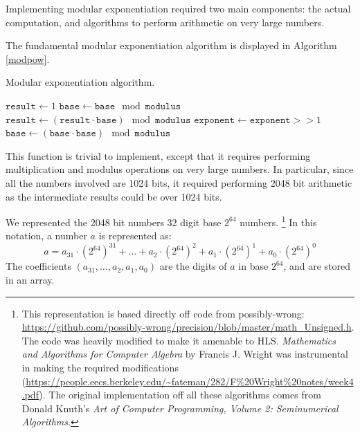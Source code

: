 Implementing modular exponentiation required two main components: the actual computation, and algorithms to perform
arithmetic on very large numbers.

The fundamental modular exponentiation algorithm is displayed in Algorithm \ref{modpow}.

\begin{algorithm}[!htb]
  \label{modpow}
  \caption[test]{Modular exponentiation algorithm.\footnotemark}
  \begin{algorithmic}
    \EndIf
    \State $\mathtt{result} \gets 1$
    \State $\mathtt{base} \gets \mathtt{base} \mod \mathtt{modulus}$
        \State $\mathtt{result} \gets (\mathtt{result} \cdot \mathtt{base}) \mod \mathtt{modulus}$
      \EndIf
      \State $\mathtt{exponent} \gets \mathtt{exponent} >> 1$
      \State $\mathtt{base} \gets (\mathtt{base} \cdot \mathtt{base}) \mod \mathtt{modulus}$
    \EndWhile
    \EndProcedure
  \end{algorithmic}
\end{algorithm}
  

This function is trivial to implement, except that it requires performing multiplication and modulus operations on very large numbers.
In particular, since all the numbers involved are 1024 bits, it required performing 2048 bit arithmetic as the intermediate results
could be over 1024 bits.

We represented the 2048 bit numbers 32 digit base $2^{64}$ numbers. \footnote{This representation is based directly off code from possibly-wrong: \url{https://github.com/possibly-wrong/precision/blob/master/math_Unsigned.h}. The code was heavily modified to make it amenable to HLS. \emph{Mathematics and Algorithms for Computer Algebra} by Francis J. Wright was instrumental in making the required modifications (\url{https://people.eecs.berkeley.edu/~fateman/282/F\%20Wright\%20notes/week4.pdf}). The original implementation off all these algorithms comes from Donald Knuth's \emph{Art of Computer Programming, Volume 2: Seminumerical Algorithms}.}
In this notation, a number $a$ is represented as:
$$a = a_{31} \cdot \left ( 2^{64} \right )^{31} + \ldots + a_{2} \cdot \left ( 2^{64} \right )^{2} + a_{1} \cdot \left ( 2^{64} \right )^{1} + a_{0} \cdot \left ( 2^{64} \right )^{0}$$
The coefficients $\left( a_{31}, \ldots, a_2, a_1, a_0 \right )$ are the digits of $a$ in base $2^{64}$, and are stored in an array.

